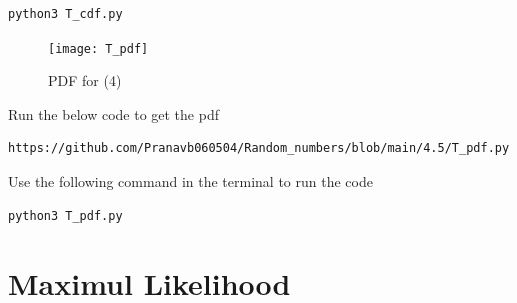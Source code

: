 \documentclass[journal,12pt,twocolumn]{IEEEtran}
\renewcommand\thesection{\arabic{section}}
\begin{document}
\begin{enumerate}[label=\thesection.\arabic*
,ref=\thesection.\theenumi]
\begin{lstlisting}
python3 T_cdf.py
\end{lstlisting}
\begin{figure}[h]
\texttt{[image: T\_pdf]}
\caption{PDF for (4)}
\label{fig:T_PDF}
\end{figure}
Run the below code to get the pdf
\begin{lstlisting}
https://github.com/Pranavb060504/Random_numbers/blob/main/4.5/T_pdf.py
\end{lstlisting}
Use the following command in the terminal to run the code
\begin{lstlisting}
python3 T_pdf.py
\end{lstlisting}
\end{enumerate}
\section{Maximul Likelihood}
\end{document}
